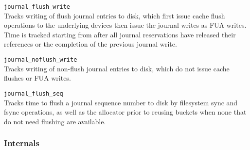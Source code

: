 \documentclass{article}
\begin{document}
\begin{description}
	\item \texttt{journal\_flush\_write} \\
		Tracks writing of flush journal entries to disk, which first
		issue cache flush operations to the underlying devices then
		issue the journal writes as FUA writes. Time is tracked starting
		from after all journal reservations have released their
		references or the completion of the previous journal write.

	\item \texttt{journal\_noflush\_write} \\
		Tracks writing of non-flush journal entries to disk, which do
		not issue cache flushes or FUA writes.

	\item \texttt{journal\_flush\_seq} \\
		Tracks time to flush a journal sequence number to disk by
		filesystem sync and fsync operations, as well as the allocator
		prior to reusing buckets when none that do not need flushing are
		available.
\end{description}

\subsubsection{Internals}
\end{document}
